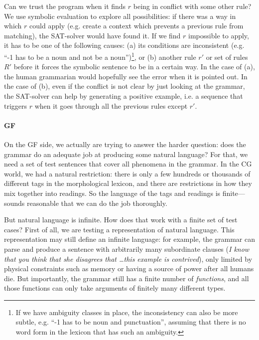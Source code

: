 Can we trust the program when it finds $r$ being in conflict with some
other rule? We use symbolic evaluation to explore all possibilities:
if there was a way in which $r$ could apply (e.g. create a context
which prevents a previous rule from matching), the SAT-solver would
have found it. If we find $r$ impossible to apply, it has to be one of
the following causes: (a) its conditions are inconsistent (e.g. ``-1
has to be a noun and not be a noun'')\footnote{If we have ambiguity
  classes in place, the inconsistency can also be more subtle,
  e.g. ``-1 has to be noun and punctuation'', assuming that there is
  no word form in the lexicon that has such an ambiguity.}, or (b)
another rule $r'$ or set of rules $R'$ before it forces the symbolic
sentence to be in a certain way. In the case of (a), the human
grammarian would hopefully see the error when it is pointed out. In
the case of (b), even if the conflict is not clear by just looking at
the grammar, the SAT-solver can help by generating a positive example,
i.e. a sequence that triggers $r$ when it goes through all the
previous rules except $r'$.


\paragraph{GF} On the GF side, we actually are trying to answer the
harder question: does the grammar do an adequate job at producing
some natural language? For that, we need a set of test sentences that
cover all phenomena in the grammar. In the CG world, we had a natural
restriction: there is only a few hundreds or thousands of different
tags in the morphological lexicon, and there are restrictions in how
they mix together into readings. So the language of the tags and
readings is finite---sounds reasonable that we can do the job
thoroughly.

But natural language is infinite. How does that work with a finite set
of test cases? First of all, we are testing a \pmcfg{} representation
of natural language. This representation may still define an infinite
language: for example, the grammar can parse and produce a sentence
with arbitrarily many subordinate clauses (\emph{I know that you think
  that she disagrees that \dots this example is contrived}), only
limited by physical constraints such as memory or having a source of
power after all humans die. But importantly, the grammar still has a
finite number of \emph{functions}, and all those functions can only
take arguments of finitely many different types.

